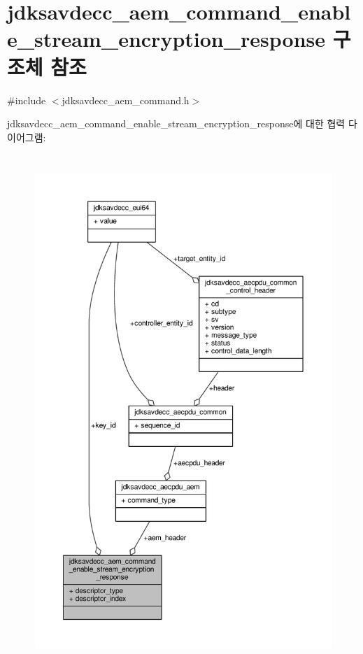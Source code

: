 \hypertarget{structjdksavdecc__aem__command__enable__stream__encryption__response}{}\section{jdksavdecc\+\_\+aem\+\_\+command\+\_\+enable\+\_\+stream\+\_\+encryption\+\_\+response 구조체 참조}
\label{structjdksavdecc__aem__command__enable__stream__encryption__response}


{\ttfamily \#include $<$jdksavdecc\+\_\+aem\+\_\+command.\+h$>$}



jdksavdecc\+\_\+aem\+\_\+command\+\_\+enable\+\_\+stream\+\_\+encryption\+\_\+response에 대한 협력 다이어그램\+:
\nopagebreak
\begin{figure}[H]
\begin{center}
\leavevmode
\includegraphics[height=550pt]{structjdksavdecc__aem__command__enable__stream__encryption__response__coll__graph}
\end{center}
\end{figure}

